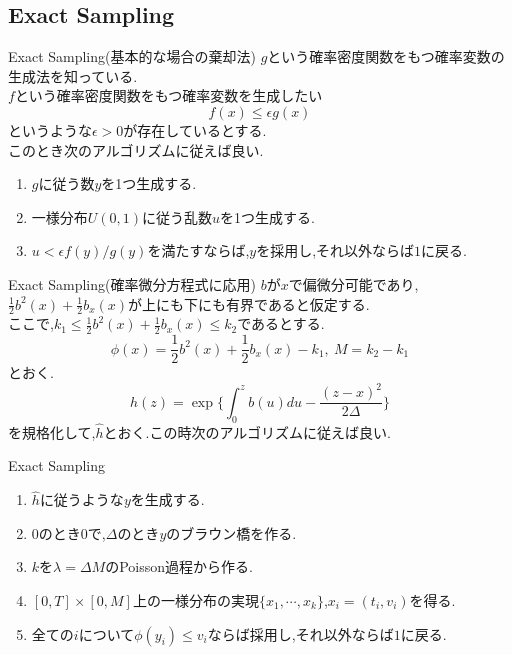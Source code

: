 \documentclass[dvipdfmx,cjk]{beamer}
\numberwithin{equation}{section}
\begin{document}
\subsection{Exact Sampling}

\begin{frame}{Exact Sampling(基本的な場合の棄却法)}
$g$という確率密度関数をもつ確率変数の生成法を知っている.\\
$f$という確率密度関数をもつ確率変数を生成したい
\[
f(x) \le \epsilon g(x)
\]
というような$\epsilon >0$が存在しているとする.\\
このとき次のアルゴリズムに従えば良い.
\begin{enumerate}
 \item $g$に従う数$y$を1つ生成する.
 \item 一様分布$U(0,1)$に従う乱数$u$を1つ生成する.
 \item $u < \epsilon f(y)/g(y) $を満たすならば,$y$を採用し,それ以外ならば$1$に戻る.
\end{enumerate}
\end{frame}

\begin{frame}{Exact Sampling(確率微分方程式に応用)}
$b$が$x$で偏微分可能であり,$\frac{1}{2} b^2(x) + \frac{1}{2}b_x(x)$が上にも下にも有界であると仮定する.\\
ここで,$k_1 \le \frac{1}{2} b^2(x) + \frac{1}{2}b_x(x) \le k_2$であるとする.\\
\[
\phi (x) =\frac{1}{2} b^2(x) + \frac{1}{2}b_x(x) -k_1, \ M= k_2 - k_1
\]
とおく.
\[
h(z) = \exp \biggl \{ \int_0^z b(u)du - \frac{(z-x)^2}{2\Delta} \biggl\}
\]
を規格化して,$\hat{h}$とおく.この時次のアルゴリズムに従えば良い.

\end{frame}

\begin{frame}{Exact Sampling}
\begin{enumerate}
 \item $\hat{h}$に従うような$y$を生成する.
 \item $0$のとき$0$で,$\Delta$のとき$y$のブラウン橋を作る.
 \item $k$を$\lambda=\Delta M$のPoisson過程から作る.
 \item $[0,T]\times [0,M]$上の一様分布の実現$\{x_1,\cdots,x_k\}$,$x_i = (t_i,v_i)$を得る.
 \item 全ての$i$について$\phi(y_i) \le v_i$ならば採用し,それ以外ならば$1$に戻る.
\end{enumerate}
\end{frame}
\end{document}
